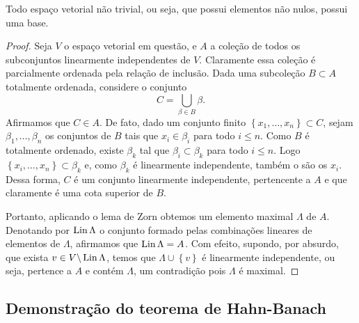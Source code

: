 \begin{prop}
    Todo espaço vetorial não trivial, ou seja, que possui elementos não nulos, possui uma base.
\end{prop}
\begin{proof}
    Seja \( V \) o espaço vetorial em questão, e \( A \) a coleção de todos os subconjuntos linearmente independentes de \( V \).
    Claramente essa coleção é parcialmente ordenada pela relação de inclusão.
    Dada uma subcoleção \( B \subset A \) totalmente ordenada, considere o conjunto
    \begin{equation}
        C = \bigcup_{ \beta \in B } \beta
    .\end{equation}
    Afirmamos que \( C \in A \).
    De fato, dado um conjunto finito \( \left\{ x_{ 1 }, \dots, x_{ n } \right\} \subset C \), sejam \( \beta_{ 1 }, \dots, \beta_{ n } \) os conjuntos de \( B \) tais que \( x_{ i } \in \beta_{ i } \) para todo \( i \leq n \).
    Como \( B \) é totalmente ordenado, existe \( \beta_{ k } \) tal que \( \beta_{ i } \subset \beta_{ k } \) para todo \( i \leq n \).
    Logo \( \left\{ x_{ i }, \dots, x_{ n } \right\} \subset  \beta_{ k } \) e, como \( \beta_{ k } \) é linearmente independente, também o são os \( x_{ i } \).
    Dessa forma, \( C \) é um conjunto linearmente independente, pertencente a \( A \) e que claramente é uma cota superior de \( B \).

    Portanto, aplicando o lema de Zorn obtemos um elemento maximal \( \Lambda \) de \( A \).
    Denotando por \( \operatorname{Lin} \Lambda \) o conjunto formado pelas combinações lineares de elementos de \( \Lambda \), afirmamos que \( \operatorname{Lin} \Lambda = A \).
    Com efeito, supondo, por absurdo, que exista \( v \in V \backslash \operatorname{Lin} \Lambda \), temos que \( \Lambda \cup \left\{ v \right\} \) é linearmente independente, ou seja, pertence a \( A \) e contém \( \Lambda \), um contradição pois \( \Lambda \) é maximal.
\end{proof}

\subsection{Demonstração do teorema de Hahn-Banach}

